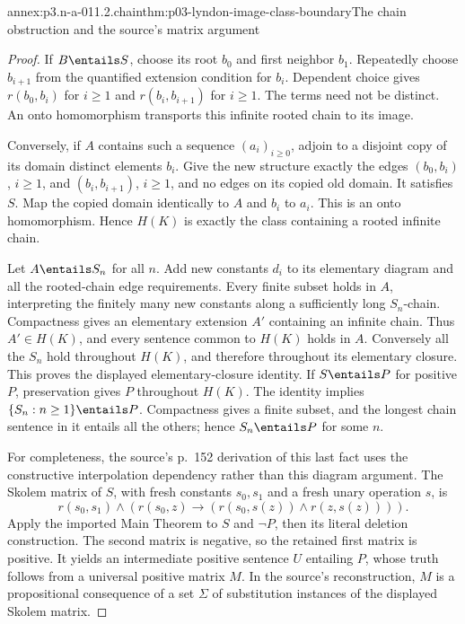 \begin{annexitem}{annex:p3.n-a-011.2.chain}{thm:p03-lyndon-image-class-boundary}{The chain obstruction and the source's matrix argument}
\begin{proof}
If \(B\entails S\), choose its root \(b_0\) and first neighbor
\(b_1\). Repeatedly choose \(b_{i+1}\) from the quantified extension
condition for \(b_i\). Dependent choice gives
\(r(b_0,b_i)\) for \(i\geq1\) and
\(r(b_i,b_{i+1})\) for \(i\geq1\). The terms need not be distinct.
An onto homomorphism transports this infinite rooted chain to its image.

Conversely, if \(A\) contains such a sequence \((a_i)_{i\geq0}\),
adjoin to a disjoint copy of its domain distinct elements \(b_i\).
Give the new structure exactly the edges \((b_0,b_i)\), \(i\geq1\),
and \((b_i,b_{i+1})\), \(i\geq1\), and no edges on its copied
old domain. It satisfies \(S\). Map the copied domain identically to
\(A\) and \(b_i\) to \(a_i\). This is an onto homomorphism.
Hence \(H(K)\) is exactly the class containing a rooted infinite chain.

Let \(A\entails S_n\) for all \(n\). Add new constants \(d_i\)
to its elementary diagram and all the rooted-chain edge requirements.
Every finite subset holds in \(A\), interpreting the finitely many
new constants along a sufficiently long \(S_n\)-chain. Compactness
gives an elementary extension \(A'\) containing an infinite chain.
Thus \(A'\in H(K)\), and every sentence common to \(H(K)\) holds
in \(A\). Conversely all the \(S_n\) hold throughout \(H(K)\),
and therefore throughout its elementary closure. This proves the
displayed elementary-closure identity. If \(S\entails P\) for
positive \(P\), preservation gives \(P\) throughout \(H(K)\).
The identity implies \(\{S_n:n\geq1\}\entails P\). Compactness
gives a finite subset, and the longest chain sentence in it entails all
the others; hence \(S_n\entails P\) for some \(n\).

For completeness, the source's p.~152 derivation of this last fact uses
the constructive interpolation dependency rather than this diagram
argument. The Skolem matrix of \(S\), with fresh constants \(s_0,s_1\)
and a fresh unary operation \(s\), is
\[
 r(s_0,s_1)\land
 (r(s_0,z)\to(r(s_0,s(z))\land r(z,s(z)))).
\]
Apply the imported Main Theorem to \(S\) and \(\neg P\), then its
literal deletion construction. The second matrix is negative, so the
retained first matrix is positive. It yields an intermediate positive
sentence \(U\) entailing \(P\), whose truth follows from a universal
positive matrix \(M\). In the source's reconstruction, \(M\) is a
propositional consequence of a set \(\Sigma\) of substitution instances
of the displayed Skolem matrix.


\end{proof}
\end{annexitem}
